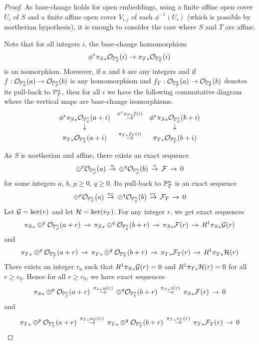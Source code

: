 \begin{proof} As base-change holds for open embeddings, using a finite affine open
cover $U_i$ of $S$ and a finite affine open cover $V_{i,j}$ of each
$\phi^{-1}(U_i)$ (which is possible by noetherian hypothesis),
it is enough to consider the case where $S$ and
$T$ are affine.

Note that for all integers $i$, the base-change homomorphism
$$\phi^*{\pi_S}_*{\mathcal O}_{\mathbb{P}^n_S}(i) \to {\pi_T}_* {\mathcal O}_{\mathbb{P}^n_T}(i)$$
is an isomorphism. Moreover, if $a$ and $b$ are any integers
and if $f : {\mathcal O}_{\mathbb{P}^n_S}(a) \to {\mathcal O}_{\mathbb{P}^n_S}(b)$ is any homomorphism
and $f_T : {\mathcal O}_{\mathbb{P}^n_T}(a) \to {\mathcal O}_{\mathbb{P}^n_T}(b)$ denotes its pull-back
to $\mathbb{P}^n_T$, then for all $i$ we have the following commutative diagram
where the vertical maps are base-change isomorphisms.
$$\begin{array}{ccc}
\phi^*{\pi_S}_*{\mathcal O}_{\mathbb{P}^n_S}(a+i)
& \stackrel{\phi^*{\pi_S}_*f(i)}{\to} &
\phi^*{\pi_S}_*{\mathcal O}_{\mathbb{P}^n_S}(b+i) \\
\downarrow & & \downarrow \\
{\pi_T}_* {\mathcal O}_{\mathbb{P}^n_T}(a+i)
& \stackrel{{\pi_T}_*f_T(i)}{\to} &
{\pi_T}_* {\mathcal O}_{\mathbb{P}^n_T}(b+i)
\end{array}
$$


As $S$ is noetherian and affine, there exists an exact sequence
$$\oplus^p {\mathcal O}_{\mathbb{P}^n_S}(a)\, \stackrel{u}{\to}  \,
\oplus^q {\mathcal O}_{\mathbb{P}^n_S}(b) \,\stackrel{v}{\to} \,\mathcal{F} \,\to \,0$$
for some integers $a$, $b$, $p\ge 0$, $q\ge 0$.
Its pull-back to $\mathbb{P}^n_T$ is an exact sequence
$$\oplus^p {\mathcal O}_{\mathbb{P}^n_T}(a)\, \stackrel{u_T}{\to}  \,
\oplus^q {\mathcal O}_{\mathbb{P}^n_S}(b) \,\stackrel{v_T}{\to} \,\mathcal{F}_T \,\to \,0$$
Let $\mathcal{G} = \operatorname{ker}(v)$ and let $\mathcal{H} = \operatorname{ker}(v_T)$.
For any integer $r$, we get exact sequences
$${\pi_S}_* \oplus^p {\mathcal O}_{\mathbb{P}^n_S}(a+r) \,\to \,
  {\pi_S}_* \oplus^q {\mathcal O}_{\mathbb{P}^n_S}(b+r) \,\to \,
  {\pi_S}_* \mathcal{F}(r)                       \,\to \,
  R^1{\pi_S}_* \mathcal{G}(r)$$
and
$${\pi_T}_* \oplus^p {\mathcal O}_{\mathbb{P}^n_T}(a+r)   \,\to \,
  {\pi_T}_* \oplus^q {\mathcal O}_{\mathbb{P}^n_T}(b+r) \,\to \,
  {\pi_T}_* \mathcal{F}_T(r)                    \,\to \,
  R^1{\pi_T}_* \mathcal{H}(r)$$
There exists an integer $r_0$ such that
$R^1{\pi_S}_*\mathcal{G}(r) =0$ and
$R^1{\pi_T}_*\mathcal{H}(r)=0$ for all $r\ge r_0$.
Hence for all $r\ge r_0$, we have exact sequences
$${\pi_S}_* \oplus^p {\mathcal O}_{\mathbb{P}^n_S}(a+r) \,\stackrel{{\pi_S}_*u(r)}{\to}\,
\oplus^q {\mathcal O}_{\mathbb{P}^n_S}(b+r) \,\stackrel{{\pi_S}_*v(r)}{\to} \,
{\pi_S}_* \mathcal{F}(r) \,\to \, 0$$
and
$${\pi_T}_* \oplus^p {\mathcal O}_{\mathbb{P}^n_T}(a+r) \,\stackrel{{\pi_T}_*u_T(r)}{\to}\,
{\pi_T}_*   \oplus^q {\mathcal O}_{\mathbb{P}^n_T}(b+r) \,\stackrel{{\pi_T}_*v_T(r)}{\to} \,
{\pi_T}_* \mathcal{F}_T(r) \,\to\, 0$$



\end{proof}
